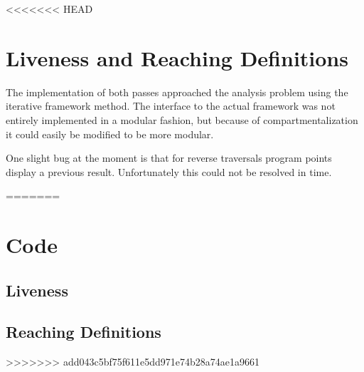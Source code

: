 \documentclass[12pt]{article}
\begin{document}
<<<<<<< HEAD

\section{Liveness and Reaching Definitions}

The implementation of both passes approached the analysis problem using the
iterative framework method. The interface to the actual framework was not
entirely implemented in a modular fashion, but because of compartmentalization
it could easily be modified to be more modular.

One slight bug at the moment is that for reverse traversals program points
display a previous result. Unfortunately this could not be resolved in time.

{\tiny }

{\tiny }
=======
\newpage
\clearpage

\section{Code}

\subsection{Liveness}

{\tiny }

\subsection{Reaching Definitions}

{\tiny }




>>>>>>> add043c5bf75f611e5dd971e74b28a74ae1a9661
\end{document}

